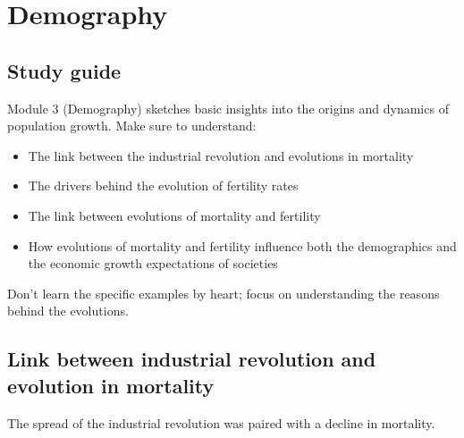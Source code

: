 \documentclass[../summary.tex]{subfiles}
\begin{document}
	
	\section{Demography}
	
	\subsection{Study guide}
	
	Module 3 (Demography) sketches basic insights into the origins and dynamics of population growth. Make sure to understand:
	\begin{itemize}
		\item The link between the industrial revolution and evolutions in mortality
		\item The drivers behind the evolution of fertility rates
		\item The link between evolutions of mortality and fertility
		\item How evolutions of mortality and fertility influence both the demographics and the economic
		growth expectations of societies
	\end{itemize}
	Don’t learn the specific examples by heart; focus on understanding the reasons behind the evolutions.
	
	\subsection{Link between industrial revolution and evolution in mortality}
	The spread of the industrial revolution was paired with a decline in mortality.  
	
\end{document}
